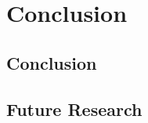 %
%
%

\chapter{Conclusion}
\label{ch:concl}

\section{Conclusion}
\label{sec:concl-conclusion}

\section{Future Research}
\label{sec:concl-future}

